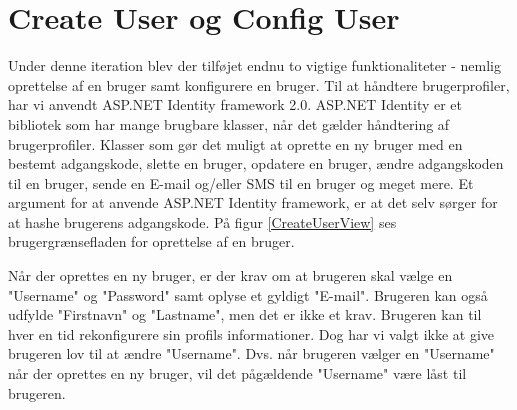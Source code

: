 \section{Create User og Config User}

Under denne iteration blev der tilføjet endnu to vigtige funktionaliteter - nemlig oprettelse af en bruger samt konfigurere en bruger. Til at håndtere brugerprofiler, har vi anvendt ASP.NET Identity framework 2.0. ASP.NET Identity er et bibliotek som har mange brugbare klasser, når det gælder håndtering af brugerprofiler. Klasser som gør det muligt at oprette en ny bruger med en bestemt adgangskode, slette en bruger, opdatere en bruger, ændre adgangskoden til en bruger, sende en E-mail og/eller SMS til en bruger og meget mere. Et argument for at anvende ASP.NET Identity framework, er at det selv sørger for at hashe brugerens adgangskode. 
På figur \ref{CreateUserView} ses brugergrænsefladen for oprettelse af en bruger.


Når der oprettes en ny bruger, er der krav om at brugeren skal vælge en "Username" og "Password" samt oplyse et gyldigt "E-mail". Brugeren kan også udfylde "Firstnavn" og "Lastname", men det er ikke et krav. Brugeren kan til hver en tid rekonfigurere sin profils informationer. Dog har vi valgt ikke at give brugeren lov til at ændre "Username". Dvs. når brugeren vælger en "Username" når der oprettes en ny bruger, vil det pågældende "Username" være låst til brugeren. 
